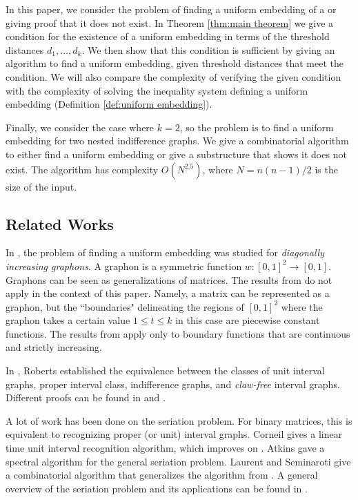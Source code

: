 \documentclass[runningheads]{llncs}
\begin{document}
In this paper, we consider the  problem of finding a uniform embedding of a \diagincmat{} or giving proof that it does not exist. In Theorem \ref{thm:main theorem} we give a condition for the existence of a uniform embedding in terms of the threshold distances $d_1,\dots , d_k$. We then show that this condition is sufficient by giving an algorithm to find a uniform embedding, given threshold distances that meet the condition. We will also compare the complexity of verifying the given condition with the complexity of solving the inequality system defining a uniform embedding (Definition \ref{def:uniform embedding}).


Finally, we consider the case where $k=2$, so the problem is to find a uniform embedding for two nested indifference graphs. We give a combinatorial algorithm to either find a uniform embedding or give a substructure that shows it does not exist. The algorithm has complexity $O(N^{2.5})$, where $N=n(n-1)/2$ is the size of the input. 





\subsection{Related Works}
In \cite{chuangpishit2017uniform}, the problem of finding a uniform embedding was studied for \emph{diagonally increasing graphons}. A graphon is a symmetric function $w:[0,1]^2\rightarrow [0,1]$. Graphons can be seen as generalizations of matrices. The results from \cite{chuangpishit2017uniform} do not apply in the context of this paper. Namely, a matrix can be represented as a graphon, but the ``boundaries" delineating the regions of $[0,1]^2$ where the graphon takes a certain value $1\leq t\leq k$ in this case are piecewise constant functions. The results from  \cite{chuangpishit2017uniform} apply only to boundary functions that are continuous and strictly increasing. 

In \cite{roberts1969indifference}, Roberts established the equivalence between 
the classes of unit interval graphs, proper interval class, indifference graphs, and {\em claw-free} interval graphs. Different proofs can be found in  \cite{bogart1998short} and 
\cite{gardi07}.

A lot of work has been done on the seriation problem. For binary matrices, this is equivalent to recognizing proper (or unit) interval graphs. 
Corneil \cite{corneil20043-sweep} gives a linear time unit interval recognition algorithm, which improves on \cite{corneil1995simple}. 
Atkins \etal \cite{atkins1998spectral} gave  a spectral algorithm for the general seriation problem.  
Laurent and Seminaroti  \cite{laurent2017lex,laurent2017similarity}  give a combinatorial algorithm that generalizes the algorithm from  \cite{corneil20043-sweep}. A general overview of the seriation problem and its applications can be found in \cite{liiv2010seriation}.
 
\end{document}
